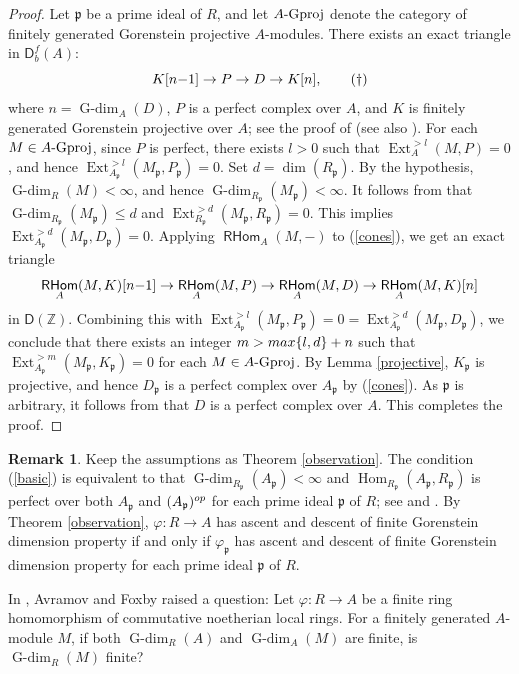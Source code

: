 \documentclass{amsart}
\newcommand{\Z}{\mathbb{Z}}
\newcommand{\D}{\mathsf{D}}
\newcommand{\0}{{\bf{0}}}
\newcommand{\p}{\mathfrak{p}}
\DeclareMathOperator{\Gdim}{G-dim}
\DeclareMathOperator{\Hom}{Hom}
\DeclareMathOperator{\Ext}{Ext}
\DeclareMathOperator{\RHom}{\mathsf{RHom}}
\theoremstyle{definition}
\newtheorem{remark}[theorem]{Remark}
\begin{document}
\begin{proof}
Let $\p$ be a prime ideal of $R$, and let $A\text{\rm -Gproj}$ denote the category of finitely generated Gorenstein projective  $A$-modules.  There exists an exact triangle in $\D^f_b(A)$:
\begin{equation}\label{cones}
K[n{\rm -}1]\rightarrow P\rightarrow D\rightarrow K[n], \tag{$\dagger$}
\end{equation}
where $n = \Gdim_{A}(D)$, $P$ is a perfect complex over $A$, and $K$ is finitely generated Gorenstein projective over $A$; see the proof of \cite[Theorem 3.1]{CI} (see also \cite[Chapter 9]{CFH}). For each $M\in A\text{\rm -Gproj}$, since $P$ is perfect, there exists $l>0$ such that $\Ext^{>l}_{A}(M, P)=0$, and hence $\Ext^{>l}_{A_\p}(M_\p,P_\p)=0$.  Set $d=\dim(R_\p)$. By the hypothesis, $\Gdim_R(M)<\infty$, and hence $\Gdim_{R_\p}(M_\p)<\infty$. It follows from \cite[Thoerem 4.13 and Corollary 4.15]{AB} that $\Gdim_{R_\p}(M_\p)\leq d$ and $\Ext^{>d}_{R_\p}(M_\p,R_\p)=0$. This implies $\Ext^{>d}_{A_\p}(M_\p,D_\p)=0$. Applying $\RHom_{A}(M, -)$ to (\ref{cones}), we get an exact triangle
$$
\RHom_A(M,K)[n{\rm -}1]\rightarrow \RHom_A(M,P)\rightarrow \RHom_A(M,D)\rightarrow \RHom_A(M,K)[n]
$$
in $\D(\Z)$. Combining this with $\Ext^{>l}_{A_\p}(M_\p,P_\p)=0=\Ext^{>d}_{A_\p}(M_\p,D_\p)$, we conclude that there exists an integer $m> {\rm max}\{l, d\} +n$ such that $\Ext^{>m}_{A_\p}(M_\p, K_\p)=0$ for each $M\in A\text{\rm -Gproj}$. By Lemma \ref{projective}, $K_\p$ is projective, and hence $D_\p$ is a perfect complex over $A_\p$  by (\ref{cones}). As $\p$ is arbitrary, it follows from \cite[Lemma 4.2]{IK22} that $D$ is a perfect complex over $A$. This completes the proof.
\end{proof}


\begin{remark}\label{question}
Keep the assumptions as Theorem \ref{observation}. 
The condition (\ref{basic}) is equivalent to that $\Gdim_{R_\p}(A_\p)<\infty$ and $\Hom_{R_\p}(A_\p,R_\p)$ is perfect over both $A_\p$ and $(A_{\p})^{\rm op}$ for each prime ideal $\p$ of $R$; see \cite[Corollary 6.3.4]{AIL} and \cite[Proposition III 6.6]{Bass}. By Theorem \ref{observation}, $\varphi\colon R\rightarrow A$ has ascent and descent of finite Gorenstein dimension property if and only if $\varphi_\p$ has ascent and descent of finite Gorenstein dimension property for each prime ideal $\p$ of $R$.
\end{remark}


In \cite[Section 4]{AF}, Avramov and Foxby raised a question:  Let $\varphi\colon R\rightarrow A$ be a finite ring homomorphism of commutative noetherian local rings. For a finitely generated $A$-module $M$, if both $\Gdim_R(A)$ and $\Gdim_A(M)$ are finite, is $\Gdim_R(M)$ finite?
\end{document}
